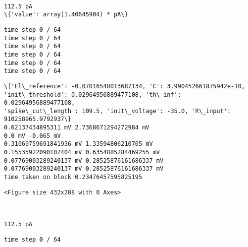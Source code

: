     
    \begin{center}
    \end{center}
    { \hspace*{\fill} \\}
    
    \begin{Verbatim}[commandchars=\\\{\}]
112.5 pA
\{'value': array(1.40645904) * pA\}
    \end{Verbatim}

    \begin{Verbatim}[commandchars=\\\{\}]
time step 0 / 64
time step 0 / 64
time step 0 / 64
time step 0 / 64
time step 0 / 64
time step 0 / 64
    \end{Verbatim}

    \begin{Verbatim}[commandchars=\\\{\}]
\{'El\_reference': -0.07016548013687134, 'C': 3.990452661875942e-10,
'init\_threshold': 0.02964956889477108, 'th\_inf': 0.02964956889477108,
'spike\_cut\_length': 109.5, 'init\_voltage': -35.0, 'R\_input': 910258965.9792937\}
0.62137434895311 mV 2.7368671294272984 mV
0.0 mV -0.065 mV
0.31069759691841936 mV 1.33594806210705 mV
0.15535922090107404 mV 0.6354885284469255 mV
0.07769003289240137 mV 0.28525876161686337 mV
0.07769003289240137 mV 0.28525876161686337 mV
time taken on block 0.23476457595825195
    \end{Verbatim}

    
    \begin{verbatim}
<Figure size 432x288 with 0 Axes>
    \end{verbatim}

    
    \begin{center}
    \end{center}
    { \hspace*{\fill} \\}
    
    \begin{Verbatim}[commandchars=\\\{\}]
112.5 pA
    \end{Verbatim}

    \begin{Verbatim}[commandchars=\\\{\}]
time step 0 / 64
    \end{Verbatim}

